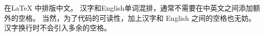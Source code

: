 \documentclass{ctexart}
\begin{document}
在\LaTeX{} 中排版中文。
汉字和English单词混排，通常不需要在中英文之间添加额外的空格。
当然，为了代码的可读性，加上汉字和 English 之间的空格也无妨。
汉字换行时不会引入多余的空格。
\end{document}
